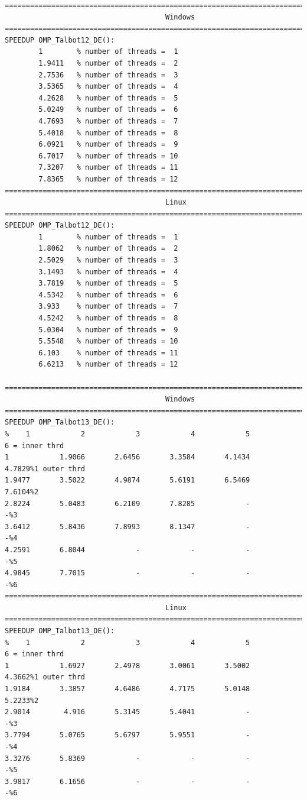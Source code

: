 \documentclass[a4paper,10pt]{report}%
\begin{document}
\begin{lstlisting}
====================================================================================
                                      Windows
====================================================================================
SPEEDUP OMP_Talbot12_DE():
        1        % number of threads =  1
        1.9411   % number of threads =  2
        2.7536   % number of threads =  3
        3.5365   % number of threads =  4
        4.2628   % number of threads =  5
        5.0249   % number of threads =  6
        4.7693   % number of threads =  7
        5.4018   % number of threads =  8
        6.0921   % number of threads =  9
        6.7017   % number of threads = 10
        7.3207   % number of threads = 11
        7.8365   % number of threads = 12
====================================================================================
                                      Linux
====================================================================================
SPEEDUP OMP_Talbot12_DE():
        1        % number of threads =  1
        1.8062   % number of threads =  2
        2.5029   % number of threads =  3
        3.1493   % number of threads =  4
        3.7819   % number of threads =  5
        4.5342   % number of threads =  6
        3.933    % number of threads =  7
        4.5242   % number of threads =  8
        5.0304   % number of threads =  9
        5.5548   % number of threads = 10
        6.103    % number of threads = 11
        6.6213   % number of threads = 12

====================================================================================
                                      Windows
====================================================================================
SPEEDUP OMP_Talbot13_DE():
%    1            2            3            4            5            6 = inner thrd
1            1.9066       2.6456       3.3584       4.1434       4.7829%1 outer thrd
1.9477       3.5022       4.9874       5.6191       6.5469       7.6104%2
2.8224       5.0483       6.2109       7.8285            -            -%3
3.6412       5.8436       7.8993       8.1347            -            -%4
4.2591       6.8044            -            -            -            -%5
4.9845       7.7015            -            -            -            -%6
====================================================================================
                                      Linux
====================================================================================
SPEEDUP OMP_Talbot13_DE():
%    1            2            3            4            5            6 = inner thrd
1            1.6927       2.4978       3.0061       3.5002       4.3662%1 outer thrd
1.9184       3.3857       4.6486       4.7175       5.0148       5.2233%2
2.9014        4.916       5.3145       5.4041            -            -%3
3.7794       5.0765       5.6797       5.9551            -            -%4
3.3276       5.8369            -            -            -            -%5
3.9817       6.1656            -            -            -            -%6
\end{lstlisting}
\end{document}
